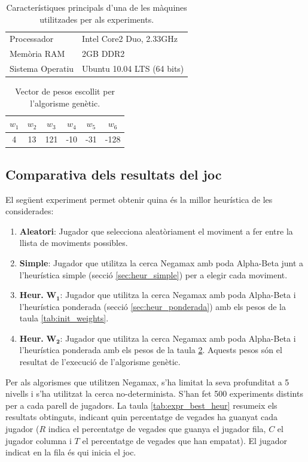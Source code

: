 \documentclass[12pt,a4paper]{article}
\begin{document}
\begin{table}[h]
\centering
\begin{tabular}{|l|l|}
\hline
Processador & Intel Core2 Duo, 2.33GHz\\
Memòria RAM & 2GB DDR2\\
Sistema Operatiu & Ubuntu 10.04 LTS (64 bits)\\
\hline
\end{tabular}
\caption{Característiques principals d'una de les màquines utilitzades per als experiments.}
\label{tab:zoiberg}
\end{table}

\begin{table}[h]
\centering
\begin{tabular}{|c|c|c|c|c|c|}
\hline $w_1$ & $w_2$  & $w_3$ & $w_4$ & $w_5$ & $w_6$ \\
\hline 4 & 13 & 121 & -10 & -31 &-128\\
\hline 
\end{tabular}
\caption{Vector de pesos escollit per l'algorisme genètic.}
\label{tab:best_weights}
\end{table}

\subsection{Comparativa dels resultats del joc}\label{sec:game_results}
El següent experiment permet obtenir quina és la millor heurística de les considerades:
\begin{enumerate}
\item \textbf{Aleatori}: Jugador que selecciona aleatòriament el moviment a fer entre la llista de moviments possibles.
\item \textbf{Simple}: Jugador que utilitza la cerca Negamax amb poda Alpha-Beta junt a l'heurística simple (secció \ref{sec:heur_simple}) per a elegir cada moviment.
\item \textbf{Heur.} $\mathbf{W_1}$: Jugador que utilitza la cerca Negamax amb poda Alpha-Beta i l'heurística ponderada (secció \ref{sec:heur_ponderada}) amb els pesos de la taula \ref{tab:init_weights}.
\item \textbf{Heur.} $\mathbf{W_2}$: Jugador que utilitza la cerca Negamax amb poda Alpha-Beta i l'heurística ponderada amb els pesos de la taula \ref{tab:best_weights}. Aquests pesos són el resultat de l'execució de l'algorisme genètic.
\end{enumerate}

Per als algorismes que utilitzen Negamax, s'ha limitat la seva profunditat a 5 nivells i s'ha utilitzat la cerca no-determinista. S'han fet 500 experiments distints per a cada parell de jugadors. La taula \ref{tab:expr_best_heur} resumeix els resultats obtinguts, indicant quin percentatge de vegades ha guanyat cada jugador ($R$ indica el percentatge de vegades que guanya el jugador fila, $C$ el jugador columna i $T$ el percentatge de vegades que han empatat). El jugador indicat en la fila és qui inicia el joc.\\
\end{document}
